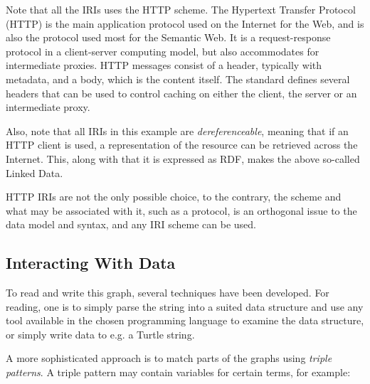 Note that all the IRIs uses the HTTP scheme. The Hypertext Transfer
Protocol (HTTP) is the main application protocol used on the Internet
for the Web, and is also the protocol used most for the Semantic
Web. It is a request-response protocol in a client-server computing
model, but also accommodates for intermediate proxies. HTTP messages
consist of a header, typically with metadata, and a body, which is the
content itself. The standard defines several headers that can be used
to control caching on either the client, the server or an intermediate
proxy.

Also, note that all IRIs in this example are \emph{dereferenceable},
meaning that if an HTTP client is used, a representation of the
resource can be retrieved across the Internet. This, along with that
it is expressed as RDF, makes the above so-called Linked Data.

HTTP IRIs are not the only possible choice, to the contrary, the
scheme and what may be associated with it, such as a protocol, is an
orthogonal issue to the data model and syntax, and any IRI scheme can
be used.

\subsection{Interacting With Data}

To read and write this graph, several techniques have been
developed. For reading, one is to simply parse the string into a
suited data structure and use any tool available in the chosen
programming language to examine the data structure, or simply write
data to e.g. a Turtle string.

A more sophisticated approach is to match parts of the graphs using
\emph{triple patterns}. A triple pattern may contain variables for
certain terms, for example:


